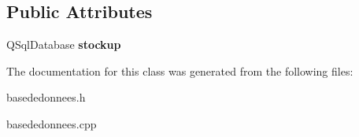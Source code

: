 \subsection*{Public Attributes}
\begin{DoxyCompactItemize}
\item 
\mbox{\label{class_base_de_donnees_a2527e35f95ca7abc94d61eabe2b8ef17}} 
Q\+Sql\+Database {\bfseries stockup}
\end{DoxyCompactItemize}


The documentation for this class was generated from the following files\+:\begin{DoxyCompactItemize}
\item 
basededonnees.\+h\item 
basededonnees.\+cpp\end{DoxyCompactItemize}
